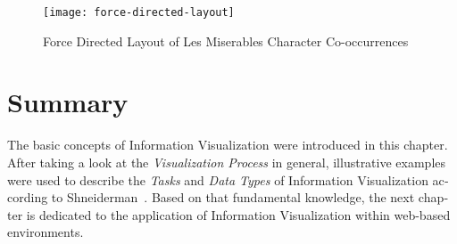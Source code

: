 \begin{english}
\begin{figure}
\centering
\texttt{[image: force-directed-layout]}
\caption{Force Directed Layout of Les Miserables Character Co-occurrences}
\label{fig:force-directed-layout}
\end{figure}


\section{Summary}

The basic concepts of Information Visualization were introduced in this chapter. After taking a look at the \emph{Visualization Process} in general, illustrative examples were used to describe the \emph{Tasks} and \emph{Data Types} of Information Visualization according to Shneiderman~\cite{shneiderman96eyes}. Based on that fundamental knowledge, the next chapter is dedicated to the application of Information Visualization within web-based environments.

\end{english}